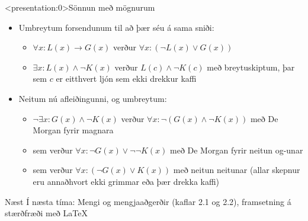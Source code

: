 \documentclass[handout]{beamer}
\begin{document}
\begin{frame}<presentation:0>{Sönnun með mögnurum}
\begin{itemize}
 \item Umbreytum forsendunum til að þær séu á sama sniði:
 \begin{itemize}
  \item $\forall x: L(x) \to G(x)$ verður $ \forall x:(\lnot L(x) \lor G(x))$
  \item $\exists x: L(x) \land \lnot K(x)$ verður $L(c) \land \lnot K(c)$ með breytuskiptum, þar sem $c$ er eitthvert ljón sem ekki drekkur kaffi
 \end{itemize}
 \item Neitum nú afleiðingunni, og umbreytum:
 \begin{itemize}
  \item $\lnot \exists x: G(x) \land \lnot K(x)$ verður $\forall x: \lnot (G(x) \land \lnot K(x))$ með De Morgan fyrir magnara
  \item sem verður $\forall x: \lnot G(x) \lor \lnot \lnot K(x)$ með De Morgan fyrir neitun og-unar
  \item sem verður $\forall x: (\lnot G(x) \lor K(x))$ með neitun neitunar (allar skepnur eru annaðhvort ekki grimmar eða þær drekka kaffi)
 \end{itemize}
\end{itemize}
\end{frame}

\begin{frame}{Næst}
Í næsta tíma: Mengi og mengjaaðgerðir (kaflar 2.1 og 2.2), framsetning á stærðfræði með \LaTeX
\end{frame}
\end{document}
